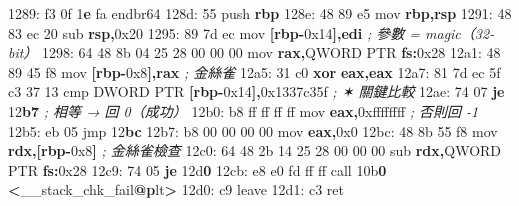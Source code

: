 \documentclass[10pt,a4paper]{article}
\newenvironment{Shaded}{\begin{snugshade}}{\end{snugshade}}
\newcommand{\BaseNTok}[1]{\textcolor[rgb]{0.00,0.00,0.81}{#1}}
\newcommand{\BuiltInTok}[1]{#1}
\newcommand{\CommentTok}[1]{\textcolor[rgb]{0.56,0.35,0.01}{\textit{#1}}}
\newcommand{\ControlFlowTok}[1]{\textcolor[rgb]{0.13,0.29,0.53}{\textbf{#1}}}
\newcommand{\DataTypeTok}[1]{\textcolor[rgb]{0.13,0.29,0.53}{#1}}
\newcommand{\DecValTok}[1]{\textcolor[rgb]{0.00,0.00,0.81}{#1}}
\newcommand{\ErrorTok}[1]{\textcolor[rgb]{0.64,0.00,0.00}{\textbf{#1}}}
\newcommand{\FloatTok}[1]{\textcolor[rgb]{0.00,0.00,0.81}{#1}}
\newcommand{\FunctionTok}[1]{\textcolor[rgb]{0.13,0.29,0.53}{\textbf{#1}}}
\newcommand{\KeywordTok}[1]{\textcolor[rgb]{0.13,0.29,0.53}{\textbf{#1}}}
\newcommand{\NormalTok}[1]{#1}
\newcommand{\OperatorTok}[1]{\textcolor[rgb]{0.81,0.36,0.00}{\textbf{#1}}}
\renewenvironment{Shaded}{%
  \def\FrameCommand{\fboxsep=3.2pt\colorbox{shadecolor}}%
  \MakeFramed{\advance\hsize-\width\FrameRestore\small}%
}{%
  \endMakeFramed
}
\begin{document}
\begin{Shaded}
\begin{Highlighting}[]
\NormalTok{1289: f3 }\FloatTok{0}\BaseNTok{f} \DecValTok{1}\ErrorTok{e}\NormalTok{ fa            endbr64}
\NormalTok{128d: 55                     }\BuiltInTok{push}   \KeywordTok{rbp}
\NormalTok{128e: 48 89 e5               mov    }\KeywordTok{rbp}\OperatorTok{,}\KeywordTok{rsp}
\NormalTok{1291: 48 83 ec }\DecValTok{20}\NormalTok{            sub    }\KeywordTok{rsp}\OperatorTok{,}\BaseNTok{0x20}
\NormalTok{1295: 89 7d ec               mov    }\OperatorTok{[}\KeywordTok{rbp}\OperatorTok{{-}}\BaseNTok{0x14}\OperatorTok{],}\KeywordTok{edi}        \CommentTok{; 參數 = magic（32{-}bit）}
\NormalTok{1298: 64 48 8b 04 25 28 00 00 00   }\BuiltInTok{mov} \KeywordTok{rax}\OperatorTok{,}\DataTypeTok{QWORD} \DataTypeTok{PTR} \KeywordTok{fs}\OperatorTok{:}\BaseNTok{0x28}
\NormalTok{12a1: 48 89 45 f8            mov    }\OperatorTok{[}\KeywordTok{rbp}\OperatorTok{{-}}\BaseNTok{0x8}\OperatorTok{],}\KeywordTok{rax}         \CommentTok{; 金絲雀}
\NormalTok{12a5: 31 c0                  }\OperatorTok{xor}    \KeywordTok{eax}\OperatorTok{,}\KeywordTok{eax}
\NormalTok{12a7: 81 7d ec }\FloatTok{5}\BaseNTok{f}\NormalTok{ c3 }\DecValTok{37} \DecValTok{13}\NormalTok{   cmp    }\DataTypeTok{DWORD} \DataTypeTok{PTR} \OperatorTok{[}\KeywordTok{rbp}\OperatorTok{{-}}\BaseNTok{0x14}\OperatorTok{],}\BaseNTok{0x1337c35f}   \CommentTok{; ✶ 關鍵比較}
\NormalTok{12ae: 74 07                  }\ControlFlowTok{je}     \DecValTok{12}\ErrorTok{b7}                  \CommentTok{; 相等 → 回 0（成功）}
\NormalTok{12b0: b8 ff ff ff ff         mov    }\KeywordTok{eax}\OperatorTok{,}\BaseNTok{0xffffffff}        \CommentTok{; 否則回 {-}1}
\NormalTok{12b5: eb }\DecValTok{05}\NormalTok{                  jmp    }\DecValTok{12}\ErrorTok{bc}
\NormalTok{12b7: b8 }\DecValTok{00} \DecValTok{00} \DecValTok{00} \DecValTok{00}\NormalTok{         mov    }\KeywordTok{eax}\OperatorTok{,}\BaseNTok{0x0}
\NormalTok{12bc: 48 8b 55 f8            mov    }\KeywordTok{rdx}\OperatorTok{,[}\KeywordTok{rbp}\OperatorTok{{-}}\BaseNTok{0x8}\OperatorTok{]}         \CommentTok{; 金絲雀檢查}
\NormalTok{12c0: 64 48 2b 14 25 28 00 00 00   }\BuiltInTok{sub} \KeywordTok{rdx}\OperatorTok{,}\DataTypeTok{QWORD} \DataTypeTok{PTR} \KeywordTok{fs}\OperatorTok{:}\BaseNTok{0x28}
\NormalTok{12c9: 74 05                  }\ControlFlowTok{je}     \DecValTok{12}\BaseNTok{d}\ErrorTok{0}
\NormalTok{12cb: e8 e0 fd ff ff         call   }\BaseNTok{10b}\ErrorTok{0} \OperatorTok{\textless{}}\NormalTok{\_\_stack\_chk\_fail}\FunctionTok{@}\ErrorTok{p}\NormalTok{lt}\OperatorTok{\textgreater{}}
\NormalTok{12d0: c9                     leave}
\NormalTok{12d1: c3                     ret}
\end{Highlighting}
\end{Shaded}
\end{document}
